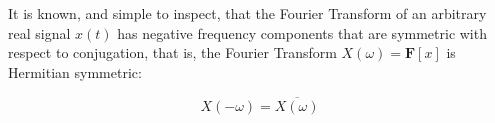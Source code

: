 %
%
%
%
%

	It is known, and simple to inspect, that the Fourier Transform of an arbitrary real signal $x(t)$ has negative frequency components  that are symmetric with respect to conjugation, that is, the Fourier Transform $X\left(\omega\right) = \mathbf{F}\left[x\right]$ is Hermitian symmetric:

\begin{equation} X\left(-\omega\right) = \overline{X\left(\omega\right)} \end{equation}

